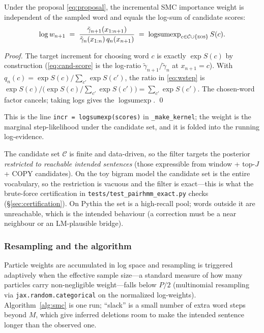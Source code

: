 \documentclass[11pt]{article}
\providecommand{\eos}{\textsc{eos}}
\providecommand{\lse}{\operatorname{logsumexp}}
\providecommand{\code}[1]{\texttt{#1}}
\begin{document}
\begin{lemma}\label{lem:collapse}
Under the proposal \eqref{eq:proposal}, the incremental SMC importance weight is independent of the sampled word and equals the log-sum of candidate scores:
\begin{equation}\label{eq:wstep}
  \log w_{n+1} \;=\; \frac{\tilde\gamma_{n+1}(x_{1:n+1})}{\tilde\gamma_n(x_{1:n})\,q_n(x_{n+1})}
               \;=\; \lse_{c\in\mathcal C\cup\{\eos\}} S(c).
\end{equation}
\end{lemma}
\begin{proof}
The target increment for choosing word $c$ is exactly $\exp S(c)$ by construction (\eqref{eq:cand-score} is the log-ratio $\tilde\gamma_{n+1}/\tilde\gamma_n$ at $x_{n+1}=c$). With $q_n(c) = \exp S(c)/\sum_{c'}\exp S(c')$, the ratio in \eqref{eq:wstep} is $\exp S(c)\big/\!\big(\exp S(c)/\sum_{c'}\exp S(c')\big) = \sum_{c'}\exp S(c')$. The chosen-word factor cancels; taking logs gives the $\lse$. \qed
\end{proof}
This is the line \code{incr = logsumexp(scores)} in \code{\_make\_kernel}; the weight is the marginal step-likelihood under the candidate set, and it is folded into the running log-evidence.

\begin{remark}
The candidate set $\mathcal C$ is finite and data-driven, so the filter targets the posterior \emph{restricted to reachable intended sentences} (those expressible from window + top-$J$ + COPY candidates). On the toy bigram model the candidate set is the entire vocabulary, so the restriction is vacuous and the filter is exact---this is what the brute-force certification in \code{tests/test\_pairhmm\_exact.py} checks (\S\ref{sec:certification}). On Pythia the set is a high-recall pool; words outside it are unreachable, which is the intended behaviour (a correction must be a near neighbour or an LM-plausible bridge).
\end{remark}

\subsubsection{Resampling and the algorithm}

Particle weights are accumulated in log space and resampling is triggered adaptively when the effective sample size---a standard measure of how many particles carry non-negligible weight---falls below $P/2$ (multinomial resampling via \code{jax.random.categorical} on the normalized log-weights). Algorithm~\ref{alg:smc} is one run; ``slack'' is a small number of extra word steps beyond $M$, which give inferred deletions room to make the intended sentence longer than the observed one.
\end{document}

